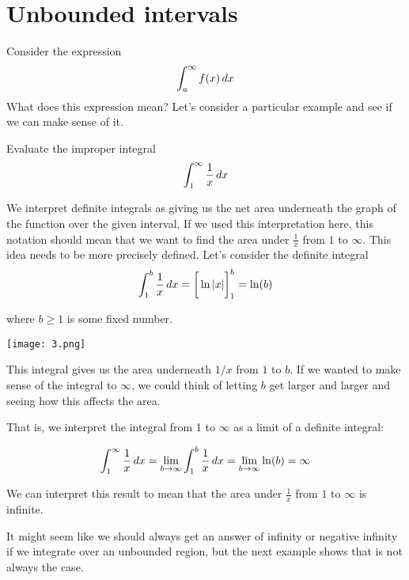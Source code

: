 \documentclass{ximera}
\begin{document}
\section{Unbounded intervals}


Consider the expression
\[ 
\int_{a}^{\infty} f(x) \mathop{}\!d x
\]
What does this expression mean?  Let's consider a particular example and see if we can make sense of it.

\begin{example}
Evaluate the improper integral
\[ 
\int_{1}^{\infty} \frac{1}{x} \mathop{}\!d x
\]
\begin{explanation}

We interpret definite integrals as giving us the net area underneath the graph of the function over the given interval. If we used this interpretation here, this notation should mean that we want to find the area under $\frac{1}{x}$ from $1$ to $\infty$.  This idea needs to be more precisely defined.  Let's consider the definite integral
\[
\int_{1}^{b} \frac{1}{x} \mathop{}\!d x=\bigg[ \ln|x| \bigg]_{1}^{b}=\ln(b)
\]

where $b \geq 1$ is some fixed number. 

\begin{image}
   \texttt{[image: 3.png]}
\end{image}


 This integral gives us the area underneath $1/x$ from $1$ to $b$. If we wanted to make sense of the integral to $\infty$, we could think of letting $b$ 
get larger and larger and seeing how this affects the area. 

That is, we interpret the integral from 1 to $\infty$ as a limit of a definite integral:

\[
\int_{1}^{\infty} \frac{1}{x} \mathop{}\!d x= \lim_{b \to \infty} \int_{1}^{b} \frac{1}{x} \mathop{}\!d x= \lim_{b \to \infty} \ln(b) = \infty
\]

We can interpret this result to mean that the area under $\frac{1}{x}$ from $1$ to $\infty$ is infinite.
\end{explanation}
\end{example}

It might seem like we should always get an answer of infinity or negative infinity if we integrate over an unbounded region, but the next example shows that is not always the case.
\end{document}
